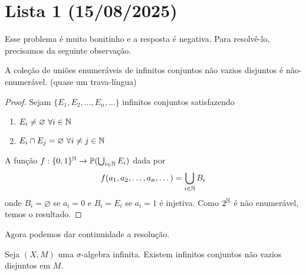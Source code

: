 \section{Lista 1 (15/08/2025)}

\prob
Esse problema é muito bonitinho e a resposta é negativa. Para resolvê-lo, precisamos da seguinte observação.
\begin{observation}
    \label{obs:1:enum}
    A coleção de uniões enumeráveis de infinitos conjuntos não vazios disjuntos é não-enumerável. (quase um trava-língua)
\end{observation}
\begin{proof}
    Sejam $\{E_1, E_2, \dots, E_n, \dots\}$ infinitos conjuntos satisfazendo
    \begin{enumerate}
        \item $E_i \neq \varnothing \ \forall i \in \mathbb{N}$ 
        \item $E_i \cap E_j = \varnothing \ \forall i \neq j \in \mathbb{N}$ 
    \end{enumerate}
    A função $f: \{0,1\}^{\mathbb{N}} \rightarrow \mathbb{P}(\bigcup_{i \in \mathbb{N}} E_i)$ dada por
    $$f(a_1, a_2, \dots, a_n, \dots) = \bigcup_{i \in \mathbb{N}} B_i$$
    onde $B_i = \varnothing$ se $a_i = 0$ e $B_i = E_i$ se $a_i = 1$ é injetiva. Como $2^{\mathbb{N}}$ é não enumerável, temos o resultado.
\end{proof}
Agora podemos dar continuidade a resolução.
\begin{prop}
    Seja $(X,M)$ uma $\sigma$-algebra infinita. Existem infinitos conjuntos não vazios disjuntos em $M$.
\end{prop}

